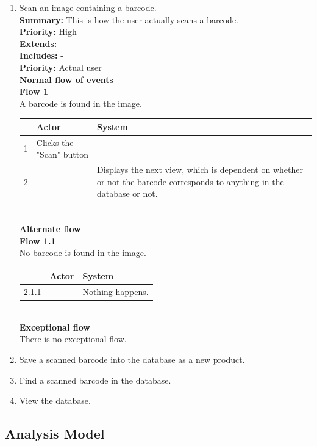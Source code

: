 \documentclass{report}
\begin{document}
\begin{enumerate}
  \item Scan an image containing a barcode. \\
    \textbf{Summary:} This is how the user actually scans a barcode. \\
    \textbf{Priority:} High \\
    \textbf{Extends:} - \\
    \textbf{Includes:} - \\
    \textbf{Priority:} Actual user \\
    \textbf{Normal flow of events} \\
    \textbf{Flow 1} \\ A barcode is found in the image. \\

    \begin{tabular}{ | l | l | p{3cm} |}
    \hline
      & Actor & System \\ \hline
    1 & Clicks the "Scan" button & \\ \hline
    2 & & Displays the next view, which is dependent on whether or not the barcode corresponds to anything in the database or not. \\
    \hline
    \end{tabular} \\

    \textbf{Alternate flow} \\
    \textbf{Flow 1.1} \\ No barcode is found in the image. \\

    \begin{tabular}{ | l | l | p{3cm} |}
    \hline
      & Actor & System \\ \hline
    2.1.1 & & Nothing happens. \\
    \hline
    \end{tabular} \\

    \textbf{Exceptional flow} \\ There is no exceptional flow.
  \item Save a scanned barcode into the database as a new product.
  \item Find a scanned barcode in the database.
  \item View the database.
\end{enumerate}

\subsection{Analysis Model}
\end{document}
